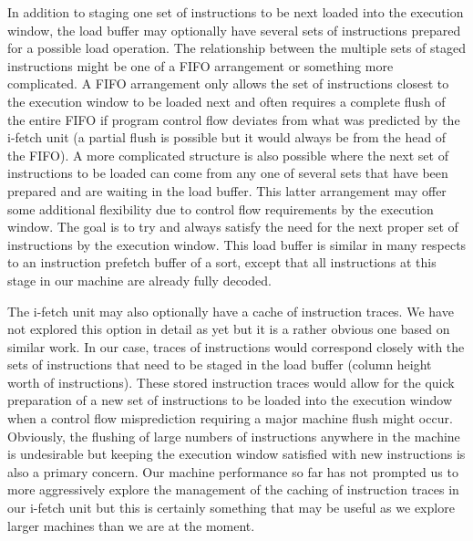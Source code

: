 In addition to staging one set of instructions to be
next loaded into the execution window, the load buffer
may optionally have several sets of instructions prepared
for a possible load operation.
The relationship between the multiple sets of staged instructions
might be one of a FIFO arrangement or something more complicated.
A FIFO arrangement only allows the set of instructions closest
to the execution window to be loaded next and often requires a
complete flush of the entire FIFO if program control flow deviates
from what was predicted by the i-fetch unit (a partial flush
is possible but it would always be from the head of the FIFO).  
A more complicated
structure is also possible where the next set of instructions
to be loaded can come from any one of several sets that
have been prepared and are waiting in the load buffer.  
This latter arrangement may offer some additional flexibility
due to control flow requirements by the execution window.
The goal is to try and always satisfy the need for the
next proper set of instructions by the execution window.
This load buffer is similar in
many respects to an instruction prefetch buffer of a sort,
except that all instructions at this stage in our machine
are already fully decoded.

The i-fetch unit may also optionally have a cache of
instruction traces.  We have not explored this option 
in detail as yet
but it is a rather obvious one based on similar work.
In our case, traces of instructions would correspond closely
with the sets of instructions that need to be staged
in the load buffer (column height worth of instructions).
These stored instruction traces would allow for the quick
preparation of a new set of instructions to be loaded
into the execution window when a control flow misprediction
requiring a major machine flush might occur.
Obviously, the flushing of large numbers of instructions
anywhere in the machine is undesirable but keeping the
execution window satisfied with new instructions is also
a primary concern.  Our machine performance so far has
not prompted us to more aggressively explore the management
of the caching of instruction traces in our i-fetch unit
but this is certainly something that may be useful as
we explore larger machines than we are at the moment.
